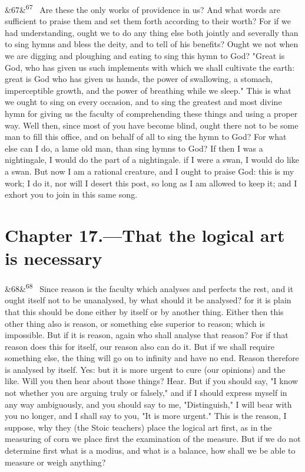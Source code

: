 \documentclass[12pt]{article}
\newcommand{\para}[1][]{\par\noindent\ifx&#1&\else\textsuperscript{\footnotesize #1}~\fi}
\begin{document}
\para[67] Are these the only works of providence in us? And what words are sufficient to praise them and set them forth according to their worth? For if we had understanding, ought we to do any thing else both jointly and severally than to sing hymns and bless the deity, and to tell of his benefits? Ought we not when we are digging and ploughing and eating to sing this hymn to God? "Great is God, who has given us such implements with which we shall cultivate the earth: great is God who has given us hands, the power of swallowing, a stomach, imperceptible growth, and the power of breathing while we sleep." This is what we ought to sing on every occasion, and to sing the greatest and most divine hymn for giving us the faculty of comprehending these things and using a proper way. Well then, since most of you have become blind, ought there not to be some man to fill this office, and on behalf of all to sing the hymn to God? For what else can I do, a lame old man, than sing hymns to God? If then I was a nightingale, I would do the part of a nightingale. if I were a swan, I would do like a swan. But now I am a rational creature, and I ought to praise God: this is my work; I do it, nor will I desert this post, so long as I am allowed to keep it; and I exhort you to join in this same song.

\section*{Chapter 17.---That the logical art is necessary}

\para[68] Since reason is the faculty which analyses and perfects the rest, and it ought itself not to be unanalysed, by what should it be analysed? for it is plain that this should be done either by itself or by another thing. Either then this other thing also is reason, or something else superior to reason; which is impossible. But if it is reason, again who shall analyse that reason? For if that reason does this for itself, our reason also can do it. But if we shall require something else, the thing will go on to infinity and have no end. Reason therefore is analysed by itself. Yes: but it is more urgent to cure (our opinions) and the like. Will you then hear about those things? Hear. But if you should say, "I know not whether you are arguing truly or falsely," and if I should express myself in any way ambiguously, and you should say to me, "Distinguish," I will bear with you no longer, and I shall say to you, "It is more urgent." This is the reason, I suppose, why they (the Stoic teachers) place the logical art first, as in the measuring of corn we place first the examination of the measure. But if we do not determine first what is a modius, and what is a balance, how shall we be able to measure or weigh anything?
\end{document}
